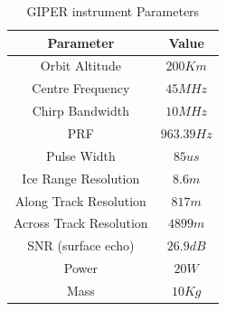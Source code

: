 \begin{table}[H]
\centering
\caption{\ac{GIPER} instrument Parameters }
\label{tab:parameter}
\begin{tabular}{|c|c|}
\hline 	\textbf{Parameter}		&  \textbf{Value}\\ 
\hline  Orbit Altitude			&  $200 Km$	\\ 
\hline  Centre Frequency		&  $45 MHz$		\\ 
\hline  Chirp Bandwidth			&  $10 MHz$		\\
\hline  PRF						&  $963.39 Hz$	\\  
\hline  Pulse Width				&  $85 us$		\\ 
\hline  Ice Range Resolution	&  $8.6 m$		\\
\hline  Along Track Resolution	&  $817 m$		\\ 
\hline  Across Track Resolution	&  $4899 m$		\\ 
\hline  SNR	(surface echo)		&  $26.9 dB$	\\ 
\hline  Power					&  $20 W$		\\ 
\hline  Mass					&  $10 Kg$		\\ 
\hline 
\end{tabular} 
\end{table}
